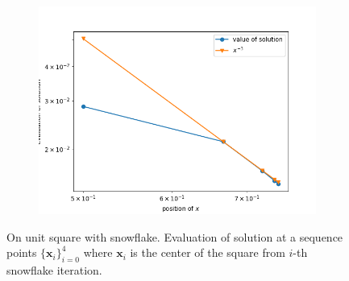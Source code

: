 \documentclass[12pt]{article}%
\theoremstyle{plain}
\numberwithin{equation}{section}
\begin{document}
  \begin{figure}[H]%
    \centering
         \begin{subfigure}[h]{0.45\linewidth}
\includegraphics[width=\linewidth]{figures/Ex3/Ex3_evaluate.png}
\end{subfigure}
  \caption{On unit square with snowflake.  Evaluation of solution at a sequence points $\{\textbf{x}_i\}_{i=0}^4$ where $\textbf{x}_i$ is the center of the square from $i$-th snowflake iteration. }
  \label{Ex3_evaluation}
 \end{figure}
  


\end{document}
